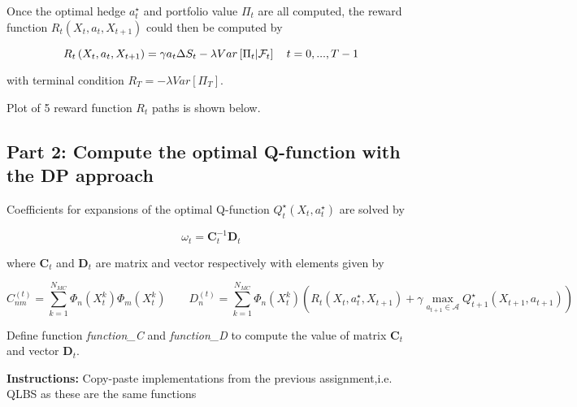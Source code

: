 \documentclass[11pt]{article}
\begin{document}
    Once the optimal hedge \(a_t^\star\) and portfolio value \(\Pi_t\) are
all computed, the reward function \(R_t\left(X_t,a_t,X_{t+1}\right)\)
could then be computed by

\[R_t\left(X_t,a_t,X_{t+1}\right)=\gamma a_t\Delta S_t-\lambda Var\left[\Pi_t\space|\space\mathcal F_t\right]\quad t=0,...,T-1\]

with terminal condition \(R_T=-\lambda Var\left[\Pi_T\right]\).

Plot of 5 reward function \(R_t\) paths is shown below.

    \subsection{Part 2: Compute the optimal Q-function with the DP
approach}\label{part-2-compute-the-optimal-q-function-with-the-dp-approach}

    Coefficients for expansions of the optimal Q-function
\(Q_t^\star\left(X_t,a_t^\star\right)\) are solved by

\[\omega_t=\mathbf C_t^{-1}\mathbf D_t\]

where \(\mathbf C_t\) and \(\mathbf D_t\) are matrix and vector
respectively with elements given by

\[C_{nm}^{\left(t\right)}=\sum_{k=1}^{N_{MC}}{\Phi_n\left(X_t^k\right)\Phi_m\left(X_t^k\right)}\quad\quad D_n^{\left(t\right)}=\sum_{k=1}^{N_{MC}}{\Phi_n\left(X_t^k\right)\left(R_t\left(X_t,a_t^\star,X_{t+1}\right)+\gamma\max_{a_{t+1}\in\mathcal{A}}Q_{t+1}^\star\left(X_{t+1},a_{t+1}\right)\right)}\]

    Define function \emph{function\_C} and \emph{function\_D} to compute the
value of matrix \(\mathbf C_t\) and vector \(\mathbf D_t\).

\textbf{Instructions:} Copy-paste implementations from the previous
assignment,i.e. QLBS as these are the same functions
\end{document}
